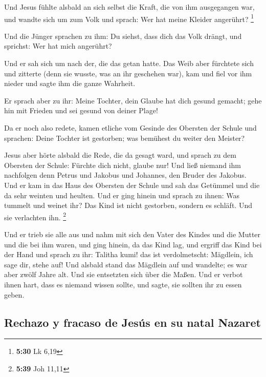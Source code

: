  Und Jesus fühlte alsbald an sich selbst die Kraft, die
von ihm ausgegangen war, und wandte sich um zum Volk und sprach: Wer hat
meine Kleider angerührt? \footnote{\textbf{5:30} Lk 6,19}

 Und die Jünger sprachen zu ihm: Du siehst, dass dich das
Volk drängt, und sprichst: Wer hat mich angerührt?

 Und er sah sich um nach der, die das getan hatte.
 Das Weib aber fürchtete sich und zitterte (denn sie
wusste, was an ihr geschehen war), kam und fiel vor ihm nieder und sagte
ihm die ganze Wahrheit.

 Er sprach aber zu ihr: Meine Tochter, dein Glaube hat
dich gesund gemacht; gehe hin mit Frieden und sei gesund von deiner
Plage!

 Da er noch also redete, kamen etliche vom Gesinde des
Obersten der Schule und sprachen: Deine Tochter ist gestorben; was
bemühest du weiter den Meister?

 Jesus aber hörte alsbald die Rede, die da gesagt ward,
und sprach zu dem Obersten der Schule: Fürchte dich nicht, glaube nur!
 Und ließ niemand ihm nachfolgen denn Petrus und Jakobus
und Johannes, den Bruder des Jakobus.  Und er kam in das
Haus des Obersten der Schule und sah das Getümmel und die da sehr
weinten und heulten.  Und er ging hinein und sprach zu
ihnen: Was tummelt und weinet ihr? Das Kind ist nicht gestorben, sondern
es schläft. Und sie verlachten ihn. \footnote{\textbf{5:39} Joh 11,11}

 Und er trieb sie alle aus und nahm mit sich den Vater
des Kindes und die Mutter und die bei ihm waren, und ging hinein, da das
Kind lag,  und ergriff das Kind bei der Hand und sprach
zu ihr: Talitha kumi! das ist verdolmetscht: Mägdlein, ich sage dir,
stehe auf!  Und alsbald stand das Mägdlein auf und
wandelte; es war aber zwölf Jahre alt. Und sie entsetzten sich über die
Maßen.  Und er verbot ihnen hart, dass es niemand wissen
sollte, und sagte, sie sollten ihr zu essen geben.

\hypertarget{rechazo-y-fracaso-de-jesuxfas-en-su-natal-nazaret}{%
\subsection{Rechazo y fracaso de Jesús en su natal
Nazaret}\label{rechazo-y-fracaso-de-jesuxfas-en-su-natal-nazaret}}

